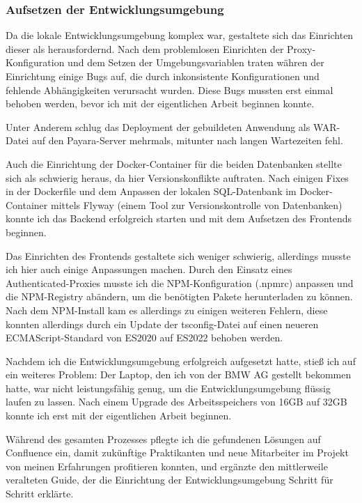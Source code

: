 \documentclass[11pt, a4paper, oneside]{scrartcl}
\begin{document}
            \subsubsection{Aufsetzen der Entwicklungsumgebung}
            Da die lokale Entwicklungsumgebung komplex war, gestaltete sich das Einrichten dieser
            als herausfordernd.
            Nach dem problemlosen Einrichten der Proxy-Konfiguration und dem Setzen der
            Umgebungsvariablen traten währen der Einrichtung einige Bugs auf,
            die durch inkonsistente Konfigurationen und fehlende Abhängigkeiten verursacht wurden.
            Diese Bugs mussten erst einmal behoben werden, bevor ich mit der eigentlichen Arbeit
            beginnen konnte.\par
            Unter Anderem schlug das Deployment der gebuildeten Anwendung als WAR-Datei auf den
            Payara-Server mehrmals, mitunter nach langen Wartezeiten fehl.\par
            Auch die Einrichtung der Docker-Container für die beiden Datenbanken stellte sich als
            schwierig heraus, da hier Versionskonflikte auftraten.
            Nach einigen Fixes in der Dockerfile und dem Anpassen der lokalen SQL-Datenbank im
            Docker-Container mittels Flyway (einem Tool zur Versionskontrolle von Datenbanken)
            konnte ich das Backend erfolgreich starten und mit dem Aufsetzen des Frontends beginnen.
            \par
            Das Einrichten des Frontends gestaltete sich weniger schwierig, allerdings musste ich
            hier auch einige Anpassungen machen.
            Durch den Einsatz eines Authenticated-Proxies musste ich die NPM-Konfiguration (.npmrc)
            anpassen und die NPM-Registry abändern, um die benötigten Pakete herunterladen zu
            können.
            Nach dem NPM-Install kam es allerdings zu einigen weiteren Fehlern, diese konnten
            allerdings durch ein Update der tsconfig-Datei auf einen neueren ECMAScript-Standard von
            ES2020 auf ES2022 behoben werden.\par
            Nachdem ich die Entwicklungsumgebung erfolgreich aufgesetzt hatte, stieß ich auf ein
            weiteres Problem:
            Der Laptop, den ich von der BMW AG gestellt bekommen hatte,
            war nicht leistungsfähig genug,
            um die Entwicklungsumgebung flüssig laufen zu lassen.
            Nach einem Upgrade des Arbeitsspeichers von 16GB auf 32GB konnte ich erst mit der
            eigentlichen Arbeit beginnen.\par
            Während des gesamten Prozesses pflegte ich die gefundenen Lösungen auf Confluence ein,
            damit zukünftige Praktikanten und neue Mitarbeiter im Projekt von meinen Erfahrungen
            profitieren konnten, und ergänzte den mittlerweile veralteten Guide, der die Einrichtung
            der Entwicklungsumgebung Schritt für Schritt erklärte.
\end{document}
